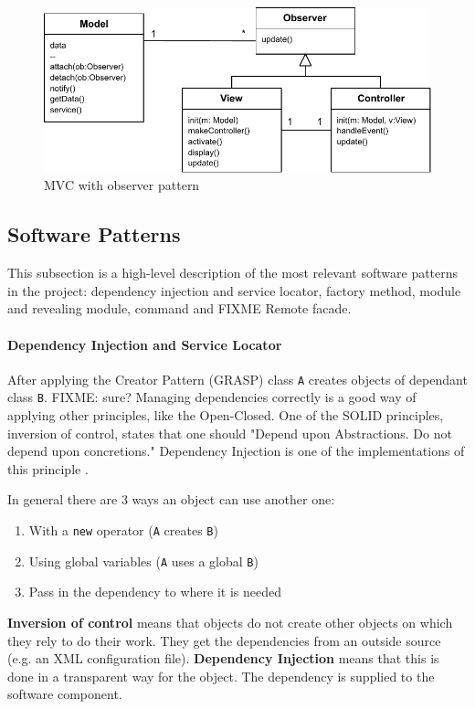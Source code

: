 \begin{figure}[htb]
    \centering
    \includegraphics{figures/design-patterns-mvc-2.pdf}
    \caption{\ac{MVC} with observer pattern}
    \label{fig:mvc-with-observer}
\end{figure}

\subsection{Software Patterns}
This subsection is a high-level description of the most relevant software patterns in the project: dependency injection and service locator, factory method, module and revealing module, command and FIXME Remote facade.

\paragraph{Dependency Injection and Service Locator} 
After applying the Creator Pattern (\ac{GRASP}) class \texttt{A} creates objects of dependant class \texttt{B}.
FIXME: sure? Managing dependencies correctly is a good way of applying other principles, like the Open-Closed.
One of the \ac{SOLID} principles, inversion of control, states that one should "Depend upon Abstractions. Do not depend upon concretions."
Dependency Injection is one of the implementations of this principle \cite{Fowler}.

In general there are 3 ways an object can use another one:
\begin{enumerate}
	\item With a \texttt{new} operator (\texttt{A} creates \texttt{B})
	\item Using global variables (\texttt{A} uses a global \texttt{B})
	\item Pass in the dependency to where it is needed
\end{enumerate}

\textbf{Inversion of control} means that objects do not create other objects on which they rely to do their work.
They get the dependencies from an outside source (e.g. an \ac{XML} configuration file).
\textbf{Dependency Injection} means that this is done in a transparent way for the object.
The dependency is supplied to the software component.


